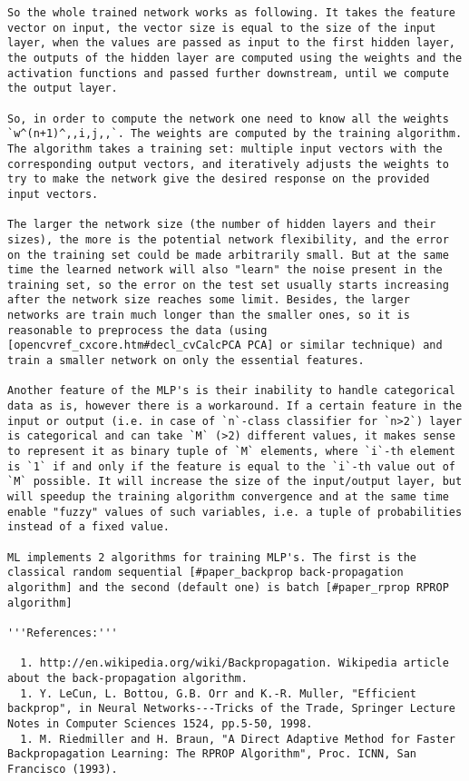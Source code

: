 \begin{verbatim}
So the whole trained network works as following. It takes the feature vector on input, the vector size is equal to the size of the input layer, when the values are passed as input to the first hidden layer, the outputs of the hidden layer are computed using the weights and the activation functions and passed further downstream, until we compute the output layer.

So, in order to compute the network one need to know all the weights `w^(n+1)^,,i,j,,`. The weights are computed by the training algorithm. The algorithm takes a training set: multiple input vectors with the corresponding output vectors, and iteratively adjusts the weights to try to make the network give the desired response on the provided input vectors.

The larger the network size (the number of hidden layers and their sizes), the more is the potential network flexibility, and the error on the training set could be made arbitrarily small. But at the same time the learned network will also "learn" the noise present in the training set, so the error on the test set usually starts increasing after the network size reaches some limit. Besides, the larger networks are train much longer than the smaller ones, so it is reasonable to preprocess the data (using [opencvref_cxcore.htm#decl_cvCalcPCA PCA] or similar technique) and train a smaller network on only the essential features.

Another feature of the MLP's is their inability to handle categorical data as is, however there is a workaround. If a certain feature in the input or output (i.e. in case of `n`-class classifier for `n>2`) layer is categorical and can take `M` (>2) different values, it makes sense to represent it as binary tuple of `M` elements, where `i`-th element is `1` if and only if the feature is equal to the `i`-th value out of `M` possible. It will increase the size of the input/output layer, but will speedup the training algorithm convergence and at the same time enable "fuzzy" values of such variables, i.e. a tuple of probabilities instead of a fixed value.

ML implements 2 algorithms for training MLP's. The first is the classical random sequential [#paper_backprop back-propagation algorithm] and the second (default one) is batch [#paper_rprop RPROP algorithm]

'''References:'''

  1. http://en.wikipedia.org/wiki/Backpropagation. Wikipedia article about the back-propagation algorithm.
  1. Y. LeCun, L. Bottou, G.B. Orr and K.-R. Muller, "Efficient backprop", in Neural Networks---Tricks of the Trade, Springer Lecture Notes in Computer Sciences 1524, pp.5-50, 1998.
  1. M. Riedmiller and H. Braun, "A Direct Adaptive Method for Faster Backpropagation Learning: The RPROP Algorithm", Proc. ICNN, San Francisco (1993).


\end{verbatim}
